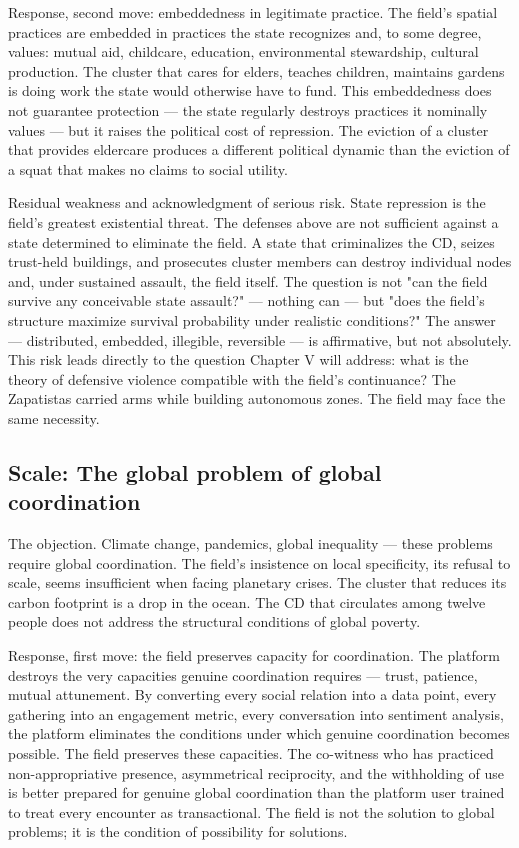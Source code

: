 Response, second move: embeddedness in legitimate practice. The field's spatial practices are embedded in practices the state recognizes and, to some degree, values: mutual aid, childcare, education, environmental stewardship, cultural production. The cluster that cares for elders, teaches children, maintains gardens is doing work the state would otherwise have to fund. This embeddedness does not guarantee protection — the state regularly destroys practices it nominally values — but it raises the political cost of repression. The eviction of a cluster that provides eldercare produces a different political dynamic than the eviction of a squat that makes no claims to social utility.

Residual weakness and acknowledgment of serious risk. State repression is the field's greatest existential threat. The defenses above are not sufficient against a state determined to eliminate the field. A state that criminalizes the CD, seizes trust-held buildings, and prosecutes cluster members can destroy individual nodes and, under sustained assault, the field itself. The question is not "can the field survive any conceivable state assault?" — nothing can — but "does the field's structure maximize survival probability under realistic conditions?" The answer — distributed, embedded, illegible, reversible — is affirmative, but not absolutely. This risk leads directly to the question Chapter V will address: what is the theory of defensive violence compatible with the field's continuance? The Zapatistas carried arms while building autonomous zones. The field may face the same necessity.

\subsection{Scale: The global problem of global coordination}

The objection. Climate change, pandemics, global inequality — these problems require global coordination. The field's insistence on local specificity, its refusal to scale, seems insufficient when facing planetary crises. The cluster that reduces its carbon footprint is a drop in the ocean. The CD that circulates among twelve people does not address the structural conditions of global poverty.

Response, first move: the field preserves capacity for coordination. The platform destroys the very capacities genuine coordination requires — trust, patience, mutual attunement. By converting every social relation into a data point, every gathering into an engagement metric, every conversation into sentiment analysis, the platform eliminates the conditions under which genuine coordination becomes possible. The field preserves these capacities. The co-witness who has practiced non-appropriative presence, asymmetrical reciprocity, and the withholding of use is better prepared for genuine global coordination than the platform user trained to treat every encounter as transactional. The field is not the solution to global problems; it is the condition of possibility for solutions.

